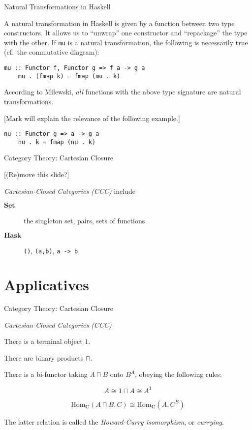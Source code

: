 \documentclass[10pt]{beamer}
\newcommand{\Cat}[1]{\ensuremath{\underline{\mathbf{#1}}}}
\newcommand{\Hom}[3]{\ensuremath{\mathrm{Hom}_{\Cat{#1}}(#2,#3)}}
\newcommand{\Com}[3]{#3^{#2}}
\newcommand{\eqnlabel}[1]{\label{eq:#1}}
\theoremstyle{definition}
\theoremstyle{remark}
\numberwithin{equation}{section}
\begin{document}
\begin{frame}[fragile]{Natural Transformations in Haskell}

  A natural transformation in Haskell is given by a function between two type
  constructors. It allows us to ``unwrap'' one constructor and ``repackage'' the
  type with the other. If \lstinline{mu} is a natural transformation, the
  following is necessarily true (cf.\ the commutative diagram):
  \begin{lstlisting}[frame=single]
    mu :: Functor f, Functor g => f a -> g a
    mu . (fmap k) = fmap (mu . k)
  \end{lstlisting}

  According to Milewski, \emph{all} functions with the above type signature are
  natural transformations.

  [Mark will explain the relevance of the following example.]
  
  \begin{lstlisting}[frame=single]
    nu :: Functor g => a -> g a
    nu . k = fmap (nu . k)
  \end{lstlisting}
  
\end{frame}

\begin{frame}[fragile]{Category Theory: Cartesian Closure}

  [(Re)move this slide?]
  
  \emph{Cartesian-Closed Categories (CCC)}
  include
  \begin{description}
    \item[\Cat{Set}] the singleton set, pairs, sets of functions
    \item[\Cat{Hask}] \lstinline{()}, \lstinline{(a,b)}, \lstinline{a -> b}
  \end{description}

\end{frame}

\section{Applicatives}

\begin{frame}[fragile]{Category Theory: Cartesian Closure}

  \emph{Cartesian-Closed Categories (CCC)}

  There is a terminal object $1$.

  There are binary products $\sqcap$.

  There is a bi-functor taking $A \sqcap B$ onto $\Com{C}{A}{B}$, obeying the following rules:
  
  \[
    A \cong 1 \sqcap A \cong \Com{C}{1}{A}
  \]
  
  \begin{equation}
  \Hom{C}{A\sqcap B}{C} \cong \Hom{C}{A}{\Com{C}{B}{C}} \eqnlabel{exp1}
  \end{equation}

  The latter relation is called the \emph{Howard-Curry isomorphism}, or \emph{currying}.
\end{frame}
\end{document}
